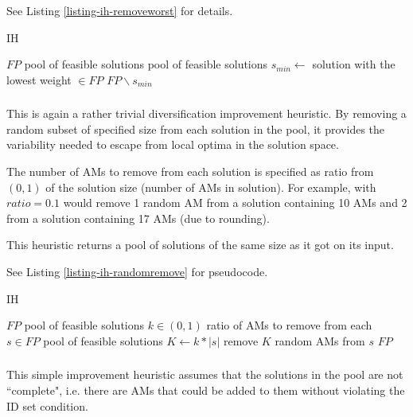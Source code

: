 See Listing \ref{listing-ih-removeworst} for details.

\begin{algorithm}
\caption{ IH}
\label{listing-ih-removeworst}
\begin{algorithmic}
\REQUIRE $FP$ pool of feasible solutions
\ENSURE pool of feasible solutions
\STATE $s_{min} \gets $ solution with the lowest weight $\in FP$
\RETURN $FP \backslash s_{min}$
\end{algorithmic}
\end{algorithm}

\subsubsection{}

This is again a rather trivial diversification improvement heuristic. By removing a random subset of specified size from each solution in the pool, it provides the variability needed to escape from local optima in the solution space.

The number of AMs to remove from each solution is specified as ratio from $(0, 1)$ of the solution size (number of AMs in solution). For example,  with $ratio = 0.1$ would remove 1 random AM from a solution containing 10 AMs and 2 from a solution containing 17 AMs (due to rounding).

This heuristic returns a pool of solutions of the same size as it got on its input.

See Listing \ref{listing-ih-randomremove} for pseudocode.

\begin{algorithm}
\caption{ IH}
\label{listing-ih-randomremove}
\begin{algorithmic}
\REQUIRE $FP$ pool of feasible solutions
\REQUIRE $k \in (0,1)$ ratio of AMs to remove from each $s \in FP$
\ENSURE pool of feasible solutions
  \STATE $K \gets k * |s|$
  \STATE remove $K$ random AMs from $s$
\ENDFOR
\RETURN $FP$
\end{algorithmic}
\end{algorithm}

\subsubsection{}

This simple improvement heuristic assumes that the solutions in the pool are not ``complete", i.e. there are AMs that could be added to them without violating the ID set condition.

